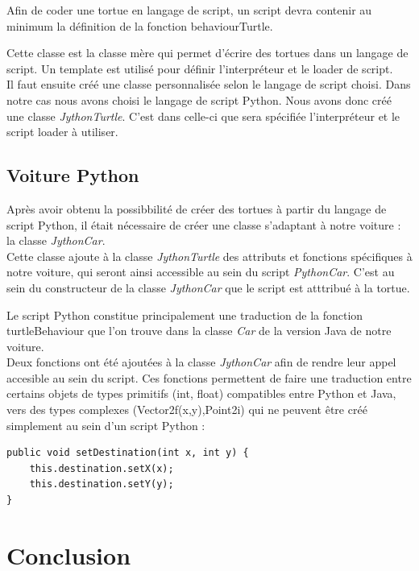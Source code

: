 \documentclass[a4paper,12pt]{report}
\begin{document}
Afin de coder une tortue en langage de script, un script devra contenir au minimum la définition de la fonction behaviourTurtle.

Cette classe est la classe mère qui permet d'écrire des tortues dans un langage de script. Un template est utilisé pour définir l'interpréteur et le loader de script. \\

Il faut ensuite créé une classe personnalisée selon le langage de script choisi. Dans notre cas nous avons choisi le langage de script Python. Nous avons donc créé une classe \emph{JythonTurtle}. C'est dans celle-ci que sera spécifiée l'interpréteur et le script loader à utiliser.

\section{Voiture Python}

Après avoir obtenu la possibbilité de créer des tortues à partir du langage de script Python, il était nécessaire de créer une classe s'adaptant à notre voiture : la classe \emph{JythonCar}.\\

Cette classe ajoute à la classe \emph{JythonTurtle} des attributs et fonctions spécifiques à notre voiture, qui seront ainsi accessible au sein du script \emph{PythonCar}. C'est au sein du constructeur de la classe \emph{JythonCar} que le script est atttribué à la tortue.

Le script Python constitue principalement une traduction de la fonction turtleBehaviour que l'on trouve dans la classe \emph{Car} de la version Java de notre voiture. \\

Deux fonctions ont été ajoutées à la classe \emph{JythonCar} afin de rendre leur appel accesible au sein du script. Ces fonctions permettent de faire une traduction entre certains objets de types primitifs (int, float) compatibles entre Python et Java, vers des types complexes (Vector2f(x,y),Point2i) qui ne peuvent être créé simplement au sein d'un script Python :

\begin{verbatim}
public void setDestination(int x, int y) {
    this.destination.setX(x);
    this.destination.setY(y);
}
\end{verbatim}

\chapter{Conclusion}
\end{document}
